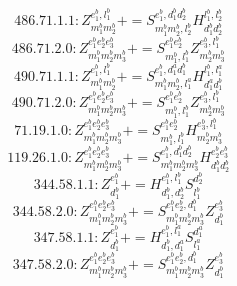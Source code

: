 \documentclass[letterpaper,10pt,fleqn,leqno,onecolumn]{article}
\begin{document}
\begin{equation} \;\;\;\;\;\;  486.71.1.1: Z^{e_{1}^{b},l_{1}^{b}}_{m_{1}^{b}m_{2}^{b}}+=S^{e_{1}^{b},d_{1}^{b}d_{2}^{b}}_{m_{1}^{b}m_{2}^{b},l_{2}^{b}}H^{l_{1}^{b},l_{2}^{b}}_{d_{1}^{b}d_{2}^{b}} \end{equation}
\begin{equation} \;\;\;\;\;\;  486.71.2.0: Z^{e_{1}^{b}e_{2}^{b}e_{3}^{b}}_{m_{1}^{b}m_{2}^{b}m_{3}^{b}}+=S^{e_{1}^{b}e_{2}^{b}}_{m_{1}^{b},l_{1}^{b}}Z^{e_{3}^{b},l_{1}^{b}}_{m_{2}^{b}m_{3}^{b}} \end{equation}
\begin{equation} \;\;\;\;\;\;  490.71.1.1: Z^{e_{1}^{b},l_{1}^{b}}_{m_{1}^{b}m_{2}^{b}}+=S^{e_{1}^{b},d_{1}^{a}d_{1}^{b}}_{m_{1}^{b}m_{2}^{b},l_{1}^{a}}H^{l_{1}^{b},l_{1}^{a}}_{d_{1}^{a}d_{1}^{b}} \end{equation}
\begin{equation} \;\;\;\;\;\;  490.71.2.0: Z^{e_{1}^{b}e_{2}^{b}e_{3}^{b}}_{m_{1}^{b}m_{2}^{b}m_{3}^{b}}+=S^{e_{1}^{b}e_{2}^{b}}_{m_{1}^{b},l_{1}^{b}}Z^{e_{3}^{b},l_{1}^{b}}_{m_{2}^{b}m_{3}^{b}} \end{equation}
\begin{equation} \;\;\;\;\;\;  71.19.1.0: Z^{e_{1}^{b}e_{2}^{b}e_{3}^{b}}_{m_{1}^{b}m_{2}^{b}m_{3}^{b}}+=S^{e_{1}^{b}e_{2}^{b}}_{m_{1}^{b},l_{1}^{b}}H^{e_{3}^{b},l_{1}^{b}}_{m_{2}^{b}m_{3}^{b}} \end{equation}
\begin{equation} \;\;\;\;\;\;  119.26.1.0: Z^{e_{1}^{b}e_{2}^{b}e_{3}^{b}}_{m_{1}^{b}m_{2}^{b}m_{3}^{b}}+=S^{e_{1}^{b},d_{1}^{b}d_{2}^{b}}_{m_{1}^{b}m_{2}^{b}m_{3}^{b}}H^{e_{2}^{b}e_{3}^{b}}_{d_{1}^{b}d_{2}^{b}} \end{equation}
\begin{equation} \;\;\;\;\;\;  344.58.1.1: Z^{e_{1}^{b}}_{d_{1}^{b}}+=H^{e_{1}^{b},l_{1}^{b}}_{d_{1}^{b},d_{2}^{b}}S^{d_{2}^{b}}_{l_{1}^{b}} \end{equation}
\begin{equation} \;\;\;\;\;\;  344.58.2.0: Z^{e_{1}^{b}e_{2}^{b}e_{3}^{b}}_{m_{1}^{b}m_{2}^{b}m_{3}^{b}}+=S^{e_{1}^{b}e_{2}^{b},d_{1}^{b}}_{m_{1}^{b}m_{2}^{b}m_{3}^{b}}Z^{e_{3}^{b}}_{d_{1}^{b}} \end{equation}
\begin{equation} \;\;\;\;\;\;  347.58.1.1: Z^{e_{1}^{b}}_{d_{1}^{b}}+=H^{e_{1}^{b},l_{1}^{a}}_{d_{1}^{b},d_{1}^{a}}S^{d_{1}^{a}}_{l_{1}^{a}} \end{equation}
\begin{equation} \;\;\;\;\;\;  347.58.2.0: Z^{e_{1}^{b}e_{2}^{b}e_{3}^{b}}_{m_{1}^{b}m_{2}^{b}m_{3}^{b}}+=S^{e_{1}^{b}e_{2}^{b},d_{1}^{b}}_{m_{1}^{b}m_{2}^{b}m_{3}^{b}}Z^{e_{3}^{b}}_{d_{1}^{b}} \end{equation}
\end{document}

